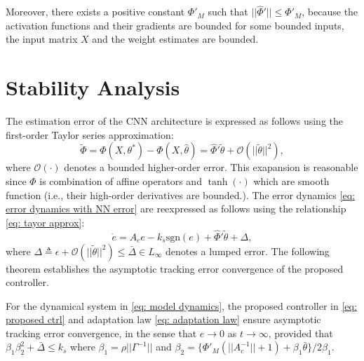 \documentclass{l4dc2025}
\begin{document}
Moreover, there exists a positive constant $\Phi'_M$ such that $||\hat\Phi'||\le\Phi'_M$, because the activation functions and their gradients are bounded for some bounded inputs, the input matrix $X$ and the weight estimates are bounded. 

\section{Stability Analysis}

The estimation error of the CNN architecture is expressed as follows using the first-order Taylor series approximation:
\begin{equation}
        \tilde \Phi = 
            \Phi(X,\theta^*)-\Phi(X,\hat\theta)
            =\hat\Phi'\tilde \theta+\mathcal{O}(||\tilde \theta||^2),
    \label{eq: tayor approx}
\end{equation}
where $\mathcal{O}(\cdot)$ denotes a bounded higher-order error.
This exapansion is reasonable since $\Phi$ is combination of affine operators and $\tanh(\cdot)$ which are smooth function (i.e., their high-order derivatives are bounded.). 
The error dynamics \eqref{eq: error dynamics with NN error} are reexpressed as follows using the relationship \eqref{eq: tayor approx}:
\begin{equation}
    \dot e = A_c e - k_s\text{sgn}(e)+\hat\Phi'\tilde \theta +\Delta,
\end{equation}
where $\Delta \triangleq \epsilon + \mathcal{O}(||\tilde\theta||^2)\le \bar\Delta\in L_\infty$ denotes a lumped error. 
The following theorem establishes the asymptotic tracking error convergence of the proposed controller.
\begin{theorem}
    For the dynamical system in \eqref{eq: model dynamics}, the proposed controller in \eqref{eq: proposed ctrl} and adaptation law \eqref{eq: adaptation law} ensure asymptotic tracking error convergence, in the sense that $e\to0$ as $t\to \infty$, provided that $\beta_1\beta_2^2+ \bar\Delta \le k_s$ where 
    $\beta_1=\rho||\Gamma^{-1}||$ and $\beta_2=\{\Phi'_M(||A_c^{-1}||+1)+\beta_1\bar\theta\}/2\beta_1$.
\end{theorem}
\end{document}
